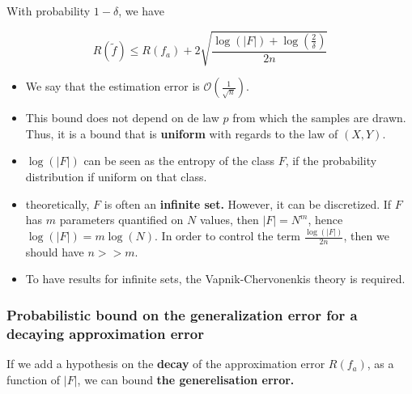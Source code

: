 \documentclass[
10pt, %
a4paper, %
oneside, %
headinclude,footinclude, %
BCOR5mm, %
]{scrartcl}
\begin{document}
    \begin{corollary}
        
	With probability $ 1-\delta$, we have

	\begin{equation}
	    R( \tilde{f})\leq R(f_a)+2 \sqrt{ \frac{ \log(|F|)+ \log( \frac{2}{\delta} )}{2n} } 
	\end{equation}
    \end{corollary}

    \begin{remark}
	\begin{itemize}
	    \item We say that the estimation error is $ \mathcal{O} ( \frac{1}{ \sqrt{n} } )$.
	    \item This bound does not depend on de law $p$ from which the samples are drawn. Thus, it is a bound that is \textbf{{uniform}} with regards to the law of $ (X,Y)$.
	    \item $\log(|F|)$ can be seen as the entropy of the class $F$, if the probability distribution if uniform on that class.
	    \item theoretically, $F$ is often an \textbf{{infinite set.}} However, it can be discretized. If $F$ has $m$ parameters quantified on $N$ values, then $ |F| = N^m$, hence $\log(|F|)=m\log(N)$. In order to control the term $ \frac{\log(|F|)}{2n} $, then we should have $ n >> m$.
	    \item To have results for infinite sets, the Vapnik-Chervonenkis theory is required.
	\end{itemize}
    \end{remark}

    \subsubsection{\large\color{Periwinkle}Probabilistic bound on the generalization error for a decaying approximation error}

    If we add a hypothesis on the \textbf{{decay}} of the approximation error $ R(f_a)$, as a function of $|F|$, we can bound \textbf{{the generelisation error.}} 
\end{document}
